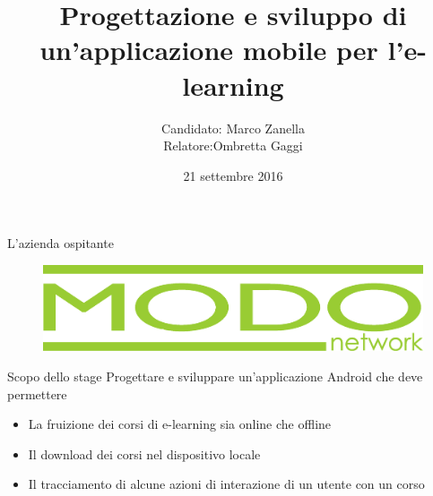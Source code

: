 \documentclass[aspectratio=43]{beamer}
\title{Progettazione e sviluppo di un'applicazione mobile per l'e-learning}
\author{Candidato: Marco Zanella \\Relatore:\hspace{13pt}Ombretta Gaggi \vspace{15pt}}
\date{21 settembre 2016}
\begin{document}
	
	\maketitle




	\begin{frame}{L'azienda ospitante}

		\begin{figure}[H]
			\centering
			\includegraphics[scale=0.1]{images/logoMN}
		\end{figure}

	\end{frame}



	\begin{frame}{Scopo dello stage}
		Progettare e sviluppare un'applicazione Android che deve permettere
		\begin{itemize}
			\item La fruizione dei corsi di e-learning sia online che offline
			\item Il download dei corsi nel dispositivo locale
			\item Il tracciamento di alcune azioni di interazione di un utente con un corso
		\end{itemize}


	\end{frame}
\end{document}
